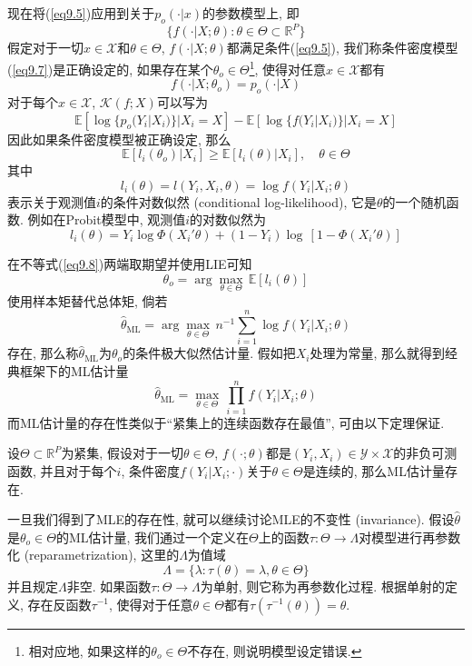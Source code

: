 \documentclass[cn, 12pt, math=mtpro2, bibstyle=apa, blue, twocol]{elegantbook}
\newcommand{\R}{\mathbb{R}}
\newcommand{\E}{\mathbb{E}}
\newcommand{\hth}{\hat{\theta}}
\begin{document}
现在将(\ref{eq9.5})应用到关于$p_o(\cdot|x)$的参数模型上, 即
\begin{equation}\label{eq9.7}
  \{f(\cdot|X;\theta): \theta\in\Theta\subset\R^P\}
\end{equation}
假定对于一切$x\in\mathscr{X}$和$\theta\in\Theta$, $f(\cdot|X;\theta)$都满足条件(\ref{eq9.5}), 我们称条件密度模型(\ref{eq9.7})是正确设定的, 如果存在某个$\theta_o\in\Theta$\footnote{相对应地, 如果这样的$\theta_o\in\Theta$不存在, 则说明模型设定错误.}, 使得对任意$x\in\mathscr{X}$都有
$$f(\cdot|X;\theta_o)=p_o(\cdot|X)$$
对于每个$x\in\mathscr{X}$, $\mathscr{K}(f;X)$可以写为
$$\E[\log\{p_o(Y_i|X_i)\}|X_i=X]-\E[\log\{f(Y_i|X_i)\}|X_i=X]$$
因此如果条件密度模型被正确设定, 那么
\begin{equation}\label{eq9.8}
  \E[ l_i(\theta_o)|X_i]\geq\E[ l_i(\theta)|X_i],\quad \theta\in\Theta
\end{equation}
其中
$$ l_i(\theta)= l(Y_i,X_i,\theta)=\log f(Y_i|X_i;\theta)$$
表示关于观测值$i$的条件对数似然 (conditional log-likelihood), 它是$\theta$的一个随机函数. 例如在Probit模型中, 观测值$i$的对数似然为
$$ l_i(\theta)=Y_i\log\Phi(X_i'\theta)+(1-Y_i)\log\,[1-\Phi(X_i'\theta)]$$

在不等式(\ref{eq9.8})两端取期望并使用LIE可知
\begin{equation}\label{eq9.9}
  \theta_o=\arg\max_{\theta\in\Theta}\,\E[ l_i(\theta)]
\end{equation}
使用样本矩替代总体矩, 倘若
$$\hat{\theta}_{\text{ML}}=\arg\max_{\theta\in\Theta}\,n^{-1}\sum_{i=1}^{n}\log f(Y_i|X_i;\theta)$$
存在, 那么称$\hat{\theta}_{\text{ML}}$为$\theta_o$的条件极大似然估计量. 假如把$X_i$处理为常量, 那么就得到经典框架下的ML估计量
$$\hat{\theta}_\text{ML}=\max_{\theta\in\Theta}\,\prod_{i=1}^{n}f(Y_i|X_i;\theta)$$
而ML估计量的存在性类似于“紧集上的连续函数存在最值”, 可由以下定理保证.
\begin{theorem}
  设$\Theta\subset\R^P$为紧集, 假设对于一切$\theta\in\Theta$, $f(\cdot;\theta)$都是$(Y_i,X_i)\in \mathscr{Y}\times \mathscr{X}$的非负可测函数, 并且对于每个$i$, 条件密度$f(Y_i|X_i;\cdot)$关于$\theta\in\Theta$是连续的, 那么ML估计量存在.
\end{theorem}
一旦我们得到了MLE的存在性, 就可以继续讨论MLE的不变性 (invariance). 假设$\hth$是$\theta_o\in\Theta$的ML估计量, 我们通过一个定义在$\Theta$上的函数$\tau:\Theta\to\Lambda$对模型进行再参数化 (reparametrization), 这里的$\Lambda$为值域
$$\Lambda=\{\lambda: \tau(\theta)=\lambda, \theta\in\Theta \}$$
并且规定$\Lambda$非空. 如果函数$\tau:\Theta\to\Lambda$为单射, 则它称为再参数化过程. 根据单射的定义, 存在反函数$\tau^{-1}$, 使得对于任意$\theta\in\Theta$都有$\tau(\tau^{-1}(\theta))=\theta$.
\end{document}
